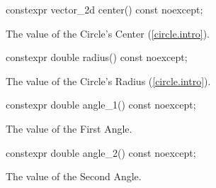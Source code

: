 \begin{itemdecl}
constexpr vector_2d center() const noexcept;
\end{itemdecl}
\begin{itemdescr}
\pnum
\returns
The value of the Circle's Center (\ref{circle.intro}).
\end{itemdescr}

\begin{itemdecl}
constexpr double radius() const noexcept;
\end{itemdecl}
\begin{itemdescr}
\pnum
\returns
The value of the Circle's Radius (\ref{circle.intro}).
\end{itemdescr}

\begin{itemdecl}
constexpr double angle_1() const noexcept;
\end{itemdecl}
\begin{itemdescr}
\pnum
\returns
The value of the First Angle.
\end{itemdescr}

\begin{itemdecl}
constexpr double angle_2() const noexcept;
\end{itemdecl}
\begin{itemdescr}
\pnum
\returns
The value of the Second Angle.
\end{itemdescr}
